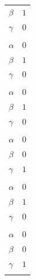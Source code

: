 \documentclass[11pt]{article}
\begin{document}
\begin{longtable}{@{}ll@{}}
$\beta$ & $1$\\
$\gamma$ & $0$\\
\addlinespace[3pt]
\multicolumn{2}{@{}l}{$\{i,j\}=\{202,221\}$, $k_{ij}=3$}\\
$\alpha$ & $0$\\
$\beta$ & $1$\\
$\gamma$ & $0$\\
\addlinespace[3pt]
\multicolumn{2}{@{}l}{$\{i,j\}=\{202,222\}$, $k_{ij}=3$}\\
$\alpha$ & $0$\\
$\beta$ & $1$\\
$\gamma$ & $0$\\
\addlinespace[3pt]
\multicolumn{2}{@{}l}{$\{i,j\}=\{203,204\}$, $k_{ij}=2^{2}\cdot 3$}\\
$\alpha$ & $0$\\
$\beta$ & $0$\\
$\gamma$ & $1$\\
\addlinespace[3pt]
\multicolumn{2}{@{}l}{$\{i,j\}=\{204,206\}$, $k_{ij}=2^{2}\cdot 3$}\\
$\alpha$ & $0$\\
$\beta$ & $1$\\
$\gamma$ & $0$\\
\addlinespace[3pt]
\multicolumn{2}{@{}l}{$\{i,j\}=\{217,218\}$, $k_{ij}=2^{2}\cdot 7$}\\
$\alpha$ & $0$\\
$\beta$ & $0$\\
$\gamma$ & $1$\\
\addlinespace[3pt]
\end{longtable}
\endgroup
\end{document}
